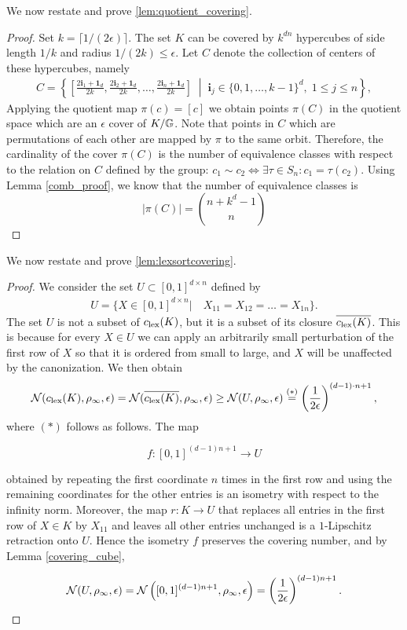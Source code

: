 We now restate and prove \ref{lem:quotient_covering}.
\quotientcovering*
\begin{proof}
\label{quotient_cover}
Set $k=\lceil 1/(2\epsilon) \rceil$. The set $K$ can be covered by $k^{dn}$ hypercubes of side length $1/k$ and radius $1/(2k)\leq \epsilon$. Let $C$ denote the collection of centers of these hypercubes, namely
\begin{align*}
C=
\left\{
\left[
\frac{2\mathbf{i}_1+\mathbf{1}_d}{2k},
\frac{2\mathbf{i}_2+\mathbf{1}_d}{2k},
\ldots,
\frac{2\mathbf{i}_n+\mathbf{1}_d}{2k}
\right]
\;\middle|\;
\mathbf{i}_j\in\{0,1,\ldots,k-1\}^d,\;
1\leq j\leq n
\right\},
\end{align*}
Applying the quotient map  $\pi(c) = [c]$ we obtain points $\pi(C)$ in the quotient space which are an $\epsilon$ cover of $K/\mathbb{G}$. Note that points in $C$ which are permutations of each other are mapped by $\pi$ to the same orbit. Therefore, the cardinality of the cover $\pi(C)$ is the number of equivalence classes with respect to the relation on $C$ defined by the group:  $c_1 \sim c_2 \iff \exists \tau \in S_n : c_1 = \tau(c_2)$. Using Lemma \ref{comb_proof}, we know that the number of equivalence classes is \begin{equation*}
|\pi(C)|=    \binom{n+k^d-1}{n}
\end{equation*}
\end{proof}
We now restate and prove \ref{lem:lexsortcovering}.
\lexsortcovering*
\begin{proof}
    \label{lexsortcovering}
    We consider the set $U \subset [0,1]^{ d \times n}$ defined by
\begin{align*}
    U= \{X\in [0,1]^{d\times n}| \quad X_{11}=X_{12}=\ldots=X_{1n}\}.
\end{align*}
The set $U$ is not a subset of $c_{\mathrm{lex}}(K)$, but it is a subset of its closure $\overline{c_{\mathrm{lex}}(K)}$. This is because for every $X \in U$ we can apply an arbitrarily small perturbation of the first row of $X$ so that it is ordered from small to large, and $X$ will be unaffected by the canonization. We then obtain
\[
\mathcal{N}(c_{\mathrm{lex}}(K),\rho_\infty,\epsilon)
=
\mathcal{N}(\overline{c_{\mathrm{lex}}(K)},\rho_\infty,\epsilon)
\geq
\mathcal{N}(U,\rho_\infty,\epsilon)
\stackrel{(*)}{=}
\left(\frac{1}{2\epsilon}\right)^{(d-1)\cdot n + 1},
\]
where $(*)$ follows as follows. The map

$$
f:[0,1]^{(d-1)n+1}\to U
$$

obtained by repeating the first coordinate $n$ times in the first row and using the remaining coordinates for the other entries is an isometry with respect to the infinity norm. Moreover, the map $r:K\to U$ that replaces all entries in the first row of $X\in K$ by $X_{11}$ and leaves all other entries unchanged is a $1$-Lipschitz retraction onto $U$. Hence the isometry $f$ preserves the covering number, and by Lemma \ref{covering_cube},

$$
\mathcal{N}(U,\rho_\infty,\epsilon)
=
\mathcal{N}\left([0,1]^{(d-1)n+1},\rho_\infty,\epsilon\right)
=
\left(\frac{1}{2\epsilon}\right)^{(d-1)n+1}.
$$

\end{proof}
